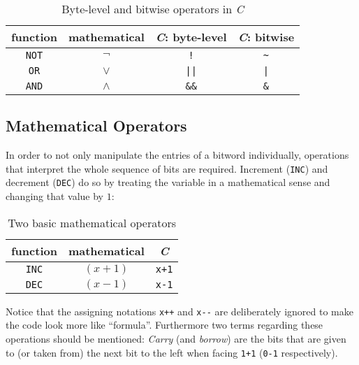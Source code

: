 \begin{table}[h]
\centering
\begin{tabular}{c|c|c|c}
function & mathematical & \emph{C}: byte-level & \emph{C}: bitwise\\
\hline
\lstinline$NOT$ & $\lnot$ & \lstinline$!$ & \lstinline$~$\\
\lstinline$OR$ & $\lor$ & \lstinline$||$ & \lstinline$|$\\
\lstinline$AND$ & $\land$ & \lstinline$&&$ & \lstinline$&$\\
\end{tabular}
\caption{Byte-level and bitwise operators in \emph{C}}
\label{table:operators}
\end{table}


\subsection*{Mathematical Operators}
In order to not only manipulate the entries of a bitword individually,
operations that interpret the whole sequence of bits are required.
Increment (\lstinline$INC$) and decrement (\lstinline$DEC$)
do so by treating the variable in a mathematical sense
and changing that value by $1$:

\begin{table}[h]
\centering
\begin{tabular}{c|c|c}
function & mathematical & \emph{C}\\
\hline
\lstinline$INC$ & $(x+1)$ & \lstinline$x+1$\\
\lstinline$DEC$ & $(x-1)$ & \lstinline$x-1$\\
\end{tabular}
\caption{Two basic mathematical operators}
\label{table:math}
\end{table}

Notice that the assigning notations \lstinline$x++$ and \lstinline$x--$
are deliberately ignored to make the code look more like ``formula''.
Furthermore two terms regarding these operations should be mentioned:
\emph{Carry} (and \emph{borrow}) are the bits
that are given to (or taken from) the next bit to the left
when facing \lstinline$1+1$ (\lstinline$0-1$ respectively).



































